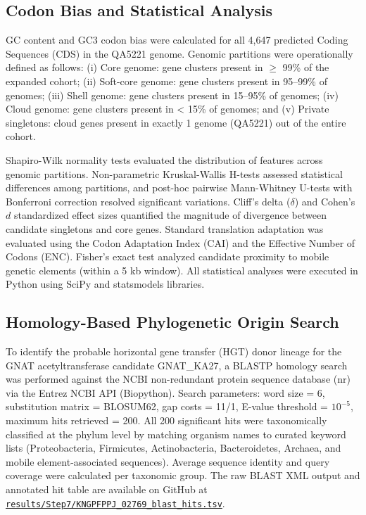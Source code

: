 \documentclass[pdflatex,sn-mathphys-num]{sn-jnl}
\begin{document}
\subsection{Codon Bias and Statistical Analysis}\label{subsec:stats}
GC content and GC3 codon bias were calculated for all 4,647 predicted Coding Sequences (CDS) in the QA5221 genome. Genomic partitions were operationally defined as follows: (i) Core genome: gene clusters present in $\ge$ 99\% of the expanded cohort; (ii) Soft-core genome: gene clusters present in 95--99\% of genomes; (iii) Shell genome: gene clusters present in 15--95\% of genomes; (iv) Cloud genome: gene clusters present in < 15\% of genomes; and (v) Private singletons: cloud genes present in exactly 1 genome (QA5221) out of the entire cohort.

Shapiro-Wilk normality tests evaluated the distribution of features across genomic partitions. Non-parametric Kruskal-Wallis H-tests assessed statistical differences among partitions, and post-hoc pairwise Mann-Whitney U-tests with Bonferroni correction resolved significant variations. Cliff's delta (\(\delta\)) and Cohen's \(d\) standardized effect sizes quantified the magnitude of divergence between candidate singletons and core genes. Standard translation adaptation was evaluated using the Codon Adaptation Index (CAI) and the Effective Number of Codons (ENC). Fisher's exact test analyzed candidate proximity to mobile genetic elements (within a 5 kb window). All statistical analyses were executed in Python using SciPy \cite{virtanen2020scipy} and statsmodels \cite{seabold2010statsmodels} libraries.

\subsection{Homology-Based Phylogenetic Origin Search}\label{subsec:hgt_blast}
To identify the probable horizontal gene transfer (HGT) donor lineage for the GNAT acetyltransferase candidate GNAT\_KA27, a BLASTP \cite{altschul1990basic} homology search was performed against the NCBI non-redundant protein sequence database (nr) via the Entrez NCBI API (Biopython). Search parameters: word size = 6, substitution matrix = BLOSUM62, gap costs = 11/1, E-value threshold = $10^{-5}$, maximum hits retrieved = 200. All 200 significant hits were taxonomically classified at the phylum level by matching organism names to curated keyword lists (Proteobacteria, Firmicutes, Actinobacteria, Bacteroidetes, Archaea, and mobile element-associated sequences). Average sequence identity and query coverage were calculated per taxonomic group. The raw BLAST XML output and annotated hit table are available on GitHub at \href{https://github.com/hosniadilemp-a11y/AMR_Novel_Gene_Discovery/blob/main/results/Step7/KNGPFPPJ_02769_blast_hits.tsv}{\texttt{results/Step7/KNGPFPPJ\_02769\_blast\_hits.tsv}}.
\end{document}
